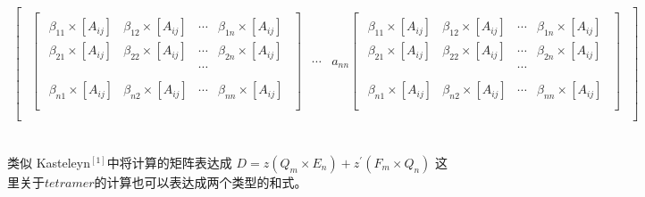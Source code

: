 \documentclass[twoside,a4paper,CCT]{cctart}   %
\begin{document}
\begin{define}
\begin{align*}
\begin{bmatrix}
\begin{smallmatrix}
\begin{bmatrix}
\begin{smallmatrix}
  \beta_{11}\times [A_{ij}]& \beta_{12}\times [A_{ij}]& \cdots&\beta_{1n}\times [A_{ij}]\\
  \beta_{21}\times [A_{ij}]& \beta_{22}\times [A_{ij}]& \cdots&\beta_{2n}\times [A_{ij}]\\
  & & \cdots&\\&\\
  \beta_{n1}\times [A_{ij}]& \beta_{n2}\times [A_{ij}]& \cdots&\beta_{nn}\times [A_{ij}]\\
 \end{smallmatrix}\end{bmatrix}&
 \cdots&
 a_{nn}\begin{bmatrix}\begin{smallmatrix}
  \beta_{11}\times [A_{ij}]& \beta_{12}\times [A_{ij}]& \cdots&\beta_{1n}\times [A_{ij}]\\
  \beta_{21}\times [A_{ij}]& \beta_{22}\times [A_{ij}]& \cdots&\beta_{2n}\times [A_{ij}]\\
  & & \cdots&\\&\\
  \beta_{n1}\times [A_{ij}]& \beta_{n2}\times [A_{ij}]& \cdots&\beta_{nn}\times [A_{ij}]\\
 \end{smallmatrix}\end{bmatrix}\\
  \end{smallmatrix}\end{bmatrix}
\end{align*}\
\end{define}
类似 Kasteleyn$^{[1]}$中将计算的矩阵表达成
$D=z(Q_{m}\times E_{n})  +  z^{'} (F_{m} \times Q_{n})$
这里关于$tetramer$的计算也可以表达成两个类型的和式。
\end{document}
